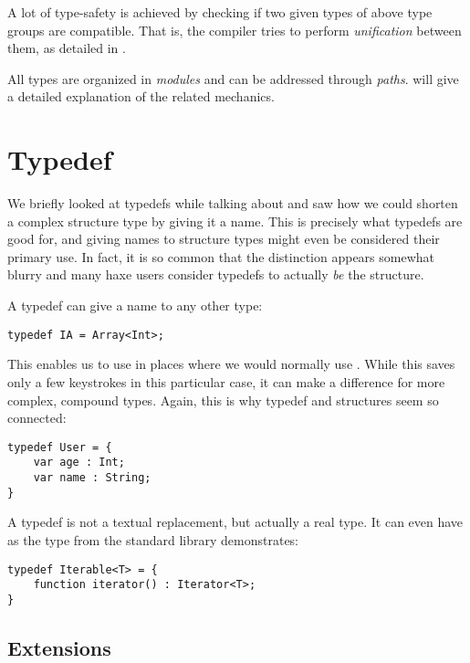 \documentclass{haxe}
\begin{document}
A lot of type-safety is achieved by checking if two given types of above type groups are compatible. That is, the compiler tries to perform \emph{unification} between them, as detailed in .

All types are organized in \emph{modules} and can be addressed through \emph{paths}.  will give a detailed explanation of the related mechanics.

\section{Typedef}
\label{type-system-typedef}

We briefly looked at typedefs while talking about  and saw how we could shorten a complex structure type by giving it a name. This is precisely what typedefs are good for, and giving names to structure types might even be considered their primary use. In fact, it is so common that the distinction appears somewhat blurry and many haxe users consider typedefs to actually \emph{be} the structure.

A typedef can give a name to any other type:

\begin{lstlisting}
typedef IA = Array<Int>;
\end{lstlisting}
This enables us to use  in places where we would normally use . While this saves only a few keystrokes in this particular case, it can make a difference for more complex, compound types. Again, this is why typedef and structures seem so connected:

\begin{lstlisting}
typedef User = {
    var age : Int;
    var name : String;
}
\end{lstlisting}
A typedef is not a textual replacement, but actually a real type. It can even have  as the  type from the standard library demonstrates:

\begin{lstlisting}
typedef Iterable<T> = {
	function iterator() : Iterator<T>;
}
\end{lstlisting}



\subsection{Extensions}
\label{type-system-extensions}
\end{document}
